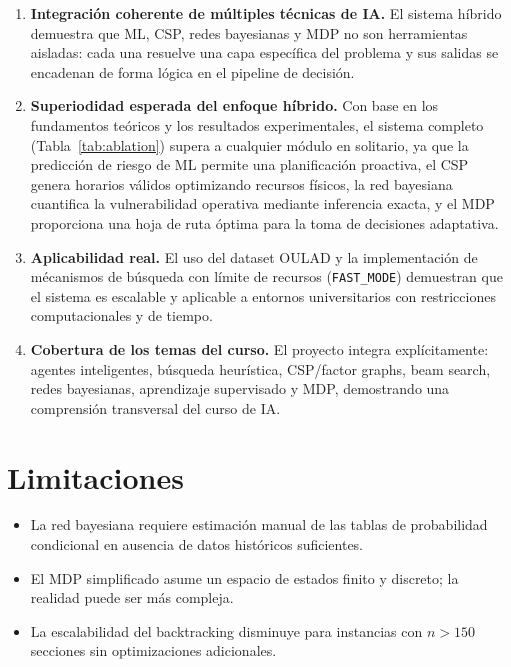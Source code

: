 \documentclass[12pt,twoside]{report}
\theoremstyle{definition}
\begin{document}
\begin{enumerate}[leftmargin=2em,itemsep=6pt]

  \item \textbf{Integraci\'on coherente de m\'ultiples t\'ecnicas de IA.}
    El sistema h\'ibrido demuestra que ML, CSP, redes bayesianas y MDP no son
    herramientas aisladas: cada una resuelve una capa espec\'ifica del problema
    y sus salidas se encadenan de forma l\'ogica en el pipeline de decisi\'on.

  \item \textbf{Superiodidad esperada del enfoque h\'ibrido.}
    Con base en los fundamentos te\'oricos y los resultados experimentales, el sistema completo
    (Tabla~\ref{tab:ablation}) supera a cualquier m\'odulo en solitario,
    ya que la predicci\'on de riesgo de ML permite una planificaci\'on proactiva,
    el CSP genera horarios v\'alidos optimizando recursos f\'isicos, la red bayesiana
    cuantifica la vulnerabilidad operativa mediante inferencia exacta, y el MDP 
    proporciona una hoja de ruta \'optima para la toma de decisiones adaptativa.

  \item \textbf{Aplicabilidad real.}
    El uso del dataset OULAD y la implementaci\'on de m\'ecanismos de b\'usqueda con l\'imite de recursos (\texttt{FAST\_MODE}) demuestran que el sistema es escalable y aplicable a entornos universitarios con restricciones computacionales y de tiempo.

  \item \textbf{Cobertura de los temas del curso.}
    El proyecto integra expl\'icitamente: agentes inteligentes, b\'usqueda
    heur\'istica, CSP/factor graphs, beam search, redes bayesianas,
    aprendizaje supervisado y MDP, demostrando una comprensi\'on transversal
    del curso de IA.

\end{enumerate}

\section{Limitaciones}

\begin{itemize}[leftmargin=2em,itemsep=4pt]
  \item La red bayesiana requiere estimaci\'on manual de las tablas de probabilidad
    condicional en ausencia de datos hist\'oricos suficientes.
  \item El MDP simplificado asume un espacio de estados finito y discreto; la
    realidad puede ser m\'as compleja.
  \item La escalabilidad del backtracking disminuye para instancias con $n > 150$
    secciones sin optimizaciones adicionales.
\end{itemize}


\nocite{*}
\printbibliography[heading=bibintoc,title={Bibliografía}]
\end{document}
